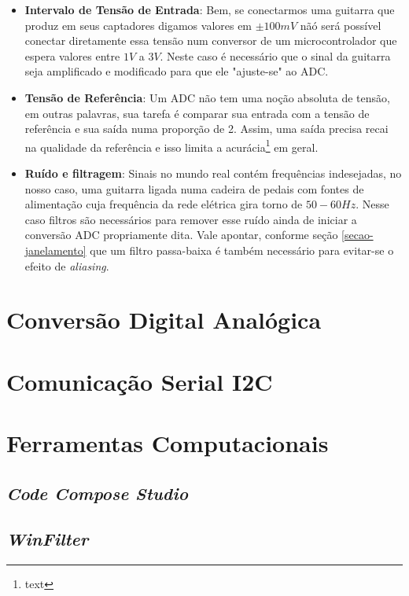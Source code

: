 		\begin{itemize}
			\item \textbf{Intervalo de Tensão de Entrada}: Bem, se conectarmos uma guitarra que produz em seus captadores digamos valores em $\pm 100 mV$ nãó será possível conectar diretamente essa tensão num conversor de um microcontrolador que espera valores entre $1V$ a $3V$. Neste caso é necessário que o sinal da guitarra seja amplificado e modificado para que ele "ajuste-se" ao ADC.
			
			\item \textbf{Tensão de Referência}: Um ADC não tem uma noção absoluta de tensão, em outras palavras, sua tarefa é comparar sua entrada com a tensão de referência e sua saída numa proporção de 2. Assim, uma saída precisa recai na qualidade da referência e isso limita a acurácia\footnote{text} em geral.
			
			\item  \textbf{Ruído e filtragem}: Sinais no mundo real contém frequências indesejadas, no nosso caso, uma guitarra ligada numa cadeira de pedais com fontes de alimentação cuja frequência da rede elétrica gira torno de $50-60Hz$. Nesse caso filtros são necessários para remover esse ruído ainda de iniciar a conversão ADC propriamente dita. Vale apontar, conforme seção \ref{secao-janelamento} que um filtro passa-baixa é também necessário para evitar-se o efeito de \textit{aliasing}.
		\end{itemize}
			
			

\section{Conversão Digital Analógica}

\section{Comunicação Serial I2C}
	
\section{Ferramentas Computacionais}

	\subsection{\textit{Code Compose Studio}}
	
	\subsection{\textit{WinFilter}}
